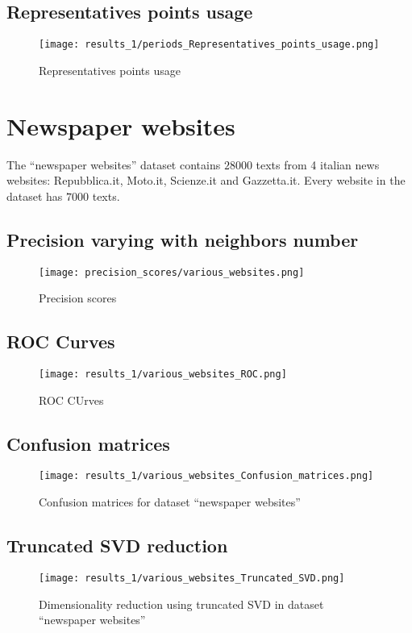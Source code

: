 \documentclass[\main/main.tex]{subfiles}
\begin{document}
\subsection{Representatives points usage}
\begin{figure}
	\texttt{[image: results\_1/periods\_Representatives\_points\_usage.png]}
	\caption{Representatives points usage}
\end{figure}

\clearpage
\section{Newspaper websites}
The ``newspaper websites'' dataset contains \(28000\) texts from 4 italian news websites: Repubblica.it, Moto.it, Scienze.it and Gazzetta.it. Every website in the dataset has \(7000\) texts.
\subsection{Precision varying with neighbors number}
\begin{figure}
	\texttt{[image: precision\_scores/various\_websites.png]}
	\caption{Precision scores}
\end{figure}
\subsection{ROC Curves}
\begin{figure}
	\texttt{[image: results\_1/various\_websites\_ROC.png]}
	\caption{ROC CUrves}
\end{figure}
\subsection{Confusion matrices}
\begin{figure}
	\texttt{[image: results\_1/various\_websites\_Confusion\_matrices.png]}
	\caption{Confusion matrices for dataset ``newspaper websites''}
\end{figure}
\subsection{Truncated SVD reduction}
\begin{figure}
	\texttt{[image: results\_1/various\_websites\_Truncated\_SVD.png]}
	\caption{Dimensionality reduction using truncated SVD in dataset ``newspaper websites''}
\end{figure}
\end{document}
